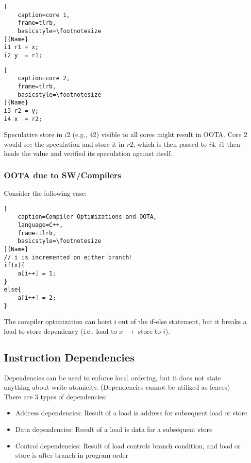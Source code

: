 \documentclass{article}
\begin{document}
\begin{multicols*}{2}
\noindent\begin{minipage}{.2\textwidth}
\captionsetup{labelformat=empty}
\begin{lstlisting}[
    caption=core 1,
    frame=tlrb, 
    basicstyle=\footnotesize
]{Name}
i1 r1 = x;
i2 y  = r1;
\end{lstlisting}
\end{minipage}\hfill
\begin{minipage}{.2\textwidth}
\captionsetup{labelformat=empty}
\begin{lstlisting}[
    caption=core 2,
    frame=tlrb,
    basicstyle=\footnotesize
]{Name}
i3 r2 = y;
i4 x  = r2;
\end{lstlisting}
\end{minipage}

\noindent\newline
Speculative store in $i2$ (e.g., 42) visible to all cores might result in OOTA. Core 2 would see the speculation and store it in $r2$, which is then passed to $i4$. $i1$ then loads the value and verified its speculation against itself.

\subsubsection{OOTA due to SW/Compilers}
Consider the following case:

\begin{lstlisting}[
    caption=Compiler Optimizations and OOTA,
    language=C++,
    frame=tlrb,
    basicstyle=\footnotesize
]{Name}
// i is incremented on either branch!
if(x){
    a[i++] = 1;
}
else{
    a[i++] = 2;
}
\end{lstlisting}

The compiler optimization can hoist i out of the if-else statement, but it breaks a load-to-store dependency (i.e., load to $x$ $\rightarrow$ store to $i$).

\subsection{Instruction Dependencies}
Dependencies can be used to enforce local ordering, but it does not state anything about write atomicity. (Dependencies cannot be utilized as fences) There are 3 types of dependencies:

\begin{itemize}
    \item Address dependencies: Result of a load is address for subsequent load or store
    \item Data dependencies: Result of a load is data for a subsequent store
    \item Control dependencies: Result of load controls branch condition, and load or store is after branch in program order
\end{itemize}


\end{multicols*}
\end{document}
